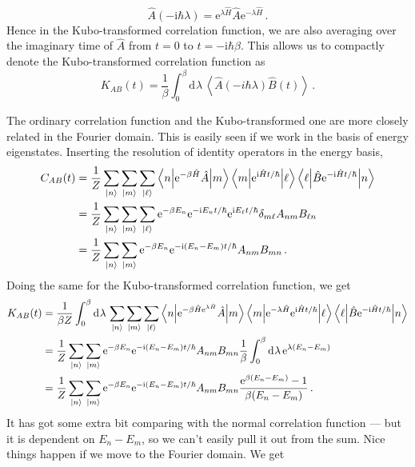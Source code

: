 \documentclass{article}
\theoremstyle{plain}\theoremheaderfont{\normalfont\itshape}\theorembodyfont{\rmfamily}\theoremseparator{.}\newtheorem*{rem}{Remark}\newtheorem*{ex}{Example}\newtheorem*{proof}{Proof}\newtheorem*{altp}{Alternative proof}
\theoremstyle{plain}\theoremheaderfont{\normalfont\bfseries}\theorembodyfont{\rmfamily}\theoremseparator{.}\newtheorem{thm}{Theorem}[section]\newtheorem{lem}[thm]{Lemma}\newtheorem{prop}[thm]{Proposition}\newtheorem*{cor}{Corollary}\newtheorem{defn}[thm]{Definition}\newtheorem{clm}[thm]{Claim}\newtheorem{clminproof}{Claim}
\theoremstyle{break}\theoremheaderfont{\normalfont\itshape}\theorembodyfont{\rmfamily}\theoremseparator{.\medskip}\newtheorem*{proofskip}{Proof}\newtheorem*{exs}{Examples}\newtheorem*{rems}{Remarks}
\theoremstyle{break}\theoremheaderfont{\normalfont\bfseries}\theorembodyfont{\rmfamily}\theoremseparator{.\medskip}\newtheorem{lemskip}[thm]{Lemma}\newtheorem{defnskip}[thm]{Definition}\newtheorem{propskip}[thm]{Proposition}\newtheorem{thmskip}[thm]{Theorem}
\numberwithin{equation}{section}
\newcommand{\ii}{\mathrm{i}}
\newcommand{\ee}{\mathrm{e}}
\newcommand{\dd}[2][]{\mathrm{d}^{#1} #2\,}
\newcommand{\ket}[1]{\left| #1 \right\rangle}
\newcommand{\mel}[3]{\left\langle #1 \middle| #2 \middle| #3 \right\rangle}
\newcommand{\eval}[1]{\left\langle #1 \right\rangle}
\begin{document}
    \begin{equation}
        \hat{A}(-\ii\hbar\lambda)=\ee^{\lambda\hat{H}}\hat{A}\ee^{-\lambda\hat{H}}\,.
    \end{equation}
    Hence in the Kubo-transformed correlation function, we are also averaging over the imaginary time of \(\hat{A}\) from \(t=0\) to \(t=-\ii\hbar\beta\). This allows us to compactly denote the Kubo-transformed correlation function as
    \begin{equation}
        K_{AB}(t)=\frac{1}{\beta}\int_{0}^{\beta}\dd{\lambda}\eval{\hat{A}(-i\hbar\lambda)\hat{B}(t)}\,.
    \end{equation}

    The ordinary correlation function and the Kubo-transformed one are more closely related in the Fourier domain. This is easily seen if we work in the basis of energy eigenstates. Inserting the resolution of identity operators in the energy basis,
    \begin{align}
        C_{AB}(t)&=\frac{1}{Z}\sum_{\ket{n}}\sum_{\ket{m}}\sum_{\ket{\ell}}\mel{n}{\ee^{-\beta\hat{H}}\hat{A}}{m}\mel{m}{\ee^{\ii\hat{H}t/\hbar}}{\ell}\mel{\ell}{\hat{B}\ee^{-\ii\hat{H}t/\hbar}}{n}\notag \\
        &=\frac{1}{Z}\sum_{\ket{n}}\sum_{\ket{m}}\sum_{\ket{\ell}}\ee^{-\beta E_n}\ee^{-\ii E_n t/\hbar}\ee^{\ii E_\ell t/\hbar}\delta_{m\ell}A_{nm}B_{\ell n}\notag \\
        &=\frac{1}{Z}\sum_{\ket{n}}\sum_{\ket{m}}\ee^{-\beta E_n}\ee^{-\ii(E_n-E_m)t/\hbar}A_{nm}B_{mn}\,.
    \end{align}
    Doing the same for the Kubo-transformed correlation function, we get
    \begin{align}
        K_{AB}(t)&=\frac{1}{\beta Z}\int_{0}^{\beta}\dd{\lambda}\sum_{\ket{n}}\sum_{\ket{m}}\sum_{\ket{\ell}}\mel{n}{\ee^{-\beta\hat{H}\ee^{\lambda \hat{H}}}\hat{A}}{m}\mel{m}{\ee^{-\lambda\hat{H}}\ee^{\ii\hat{H}t/\hbar}}{\ell}\mel{\ell}{\hat{B}\ee^{-\ii\hat{H}t/\hbar}}{n}\notag \\
        &=\frac{1}{Z}\sum_{\ket{n}}\sum_{\ket{m}}\ee^{-\beta E_n}\ee^{-\ii(E_n-E_m)t/\hbar}A_{nm}B_{mn}\frac{1}{\beta}\int_{0}^{\beta}\dd{\lambda}\ee^{\lambda(E_n-E_m)}\notag\\
        &=\frac{1}{Z}\sum_{\ket{n}}\sum_{\ket{m}}\ee^{-\beta E_n}\ee^{-\ii(E_n-E_m)t/\hbar}A_{nm}B_{mn}\frac{\ee^{\beta(E_n-E_m)}-1}{\beta(E_n-E_m)}\,.
    \end{align}
    It has got some extra bit comparing with the normal correlation function --- but it is dependent on \(E_n-E_m\), so we can't easily pull it out from the sum. Nice things happen if we move to the Fourier domain. We get
\end{document}
